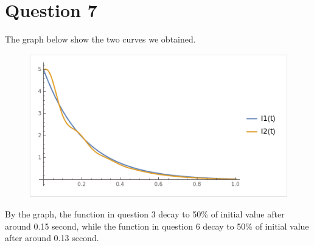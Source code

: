 \documentclass[12pt,a4paper]{article}
\begin{document}
\section*{Question 7}

\begin{solution}
The graph below show the two curves we obtained.
    \begin{figure}[H]
        \centering
        \includegraphics[width=0.75\linewidth]{8c8cda5b-57d1-4cc1-99c2-0a4f0d438c01.png}
        \label{fig:enter-label}
    \end{figure}

    By the graph, the function in question 3 decay to 50\% of initial value after around 0.15 second, while the function in question 6 decay to  50\% of initial value after around 0.13 second.
    

    
\end{solution}

\printbibliography
\end{document}
